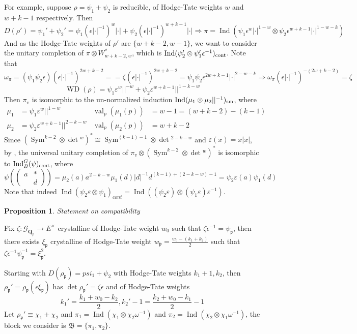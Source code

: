 \documentclass[leqno]{amsart}
\newcommand{\smat}[1]{\left( \begin{smallmatrix} #1 \end{smallmatrix} \right)}
\newcommand{\B}{\mathfrak B}
\newcommand{\Gp}{\mathcal{G}_{\Qp}} %
\DeclareMathOperator{\WD}{WD}
\newcommand{\cont}{\textnormal{cont}}
\newcommand{\sm}{\textnormal{sm}}
\DeclareMathOperator{\Sym}{Sym}
\newcommand{\Qp}{\mathbf{Q}_p}
\DeclareMathOperator{\val}{val}
\newcommand{\fp}{\mathfrak{p}}
\DeclareMathOperator{\Ind}{Ind}
\newtheorem{prop}[thm]{Proposition}
\theoremstyle{definition}
\theoremstyle{remark}
\begin{document}
For example, suppose 
$\rho=\psi_1+\psi_2$ is reducible,
of Hodge-Tate weights 
$w$ and  $w+k-1$ respectively. Then
\[
	D(\rho')=\psi_1'+\psi_2'=
	\psi_1(\epsilon|\cdot|^{-1})^w|\cdot|+
	\psi_2(\epsilon|\cdot|^{-1})^{w+k-1}|\cdot|
	\Longrightarrow
	\pi=\Ind
	( \psi_1\epsilon^w|\cdot|^{1-w}\otimes
	\psi_2\epsilon^{w+k-1}|\cdot|^{1-w-k})
\]
And as the Hodge-Tate weights of $\rho'$
are  $\{w+k-2,w-1\}$,
we want to consider the unitary completion 
of  $\pi\otimes W_{w+k-2,w}^*$,
which is $\Ind(\psi_2'\otimes\psi_1'\epsilon^{-1})_{\cont}$.
Note that
\[
	\omega_\pi
	=(\psi_1\psi_2\epsilon)
	(\epsilon|\cdot|^{-1})^{2w+k-2}=
	=\zeta (\epsilon|\cdot|^{-1})^{2w+k-2}=
	\psi_1\psi_2\epsilon^{2w+k-1}
	|\cdot|^{2-w-k}
	\Longrightarrow
	\omega_\pi
	(\epsilon|\cdot|^{-1})^{-(2w+k-2)}=\zeta
\]
\[
	\WD(\rho)=\psi_1\varepsilon^w||^{-w}+
	\psi_2\varepsilon^{w+k-1}||^{1-k-w}
\]
Then $\pi_v$ is isomorphic to the un-normalized induction
$\Ind(\mu_1\otimes\mu_2||^{-1})_{\sm}$, where
\begin{align*}
	\mu_1&=\psi_1\varepsilon^{w}||^{1-w} &
	\val_p(\mu_1(p))&=w-1=(w+k-2)-(k-1)\\
	\mu_2&=\psi_2\varepsilon^{w+k-1}||^{2-k-w} &
	\val_p(\mu_2(p))&=w+k-2
\end{align*}
Since $(\Sym^{k-2}\otimes\det{}^w)^*\cong \Sym^{(k-1)-1}\otimes\det{}^{2-k-w}$
and $\varepsilon(x)=x|x|$,
by \cite[Thm 12.3]{pask}, 
the universal unitary completion
of $\pi_v\otimes(\Sym^{k-2}\otimes\det{}^w)^*$
is isomorphic to $\Ind_B^G(\psi)_{\cont}$, where
\[
	\psi(\smat{a&*\\&d})=\mu_2(a)a^{2-k-w}\mu_1(d)|d|^{-1}d^{(k-1)+(2-k-w)-1}
	=\psi_2\varepsilon(a)\psi_1(d)
\]
Note that indeed 
$\Ind(\psi_2\varepsilon\otimes\psi_1)_{cont}=
\Ind((\psi_2\varepsilon)\otimes(\psi_1\varepsilon)\varepsilon^{-1})$.


\begin{prop}
	Statement on compatibility
\end{prop}

Fix $\zeta\colon \Gp\to E^\times$
crystalline of Hodge-Tate weight  $w_0$
such that  $\zeta\epsilon^{-1}=\psi_\fp$,
then there exists $\xi_\fp$
crystalline of Hodge-Tate weight  
$w_\fp=\frac{w_0-(k_1+k_2)}{2}$
such that $\zeta\epsilon^{-1}\psi_\fp^{-1}=\xi_\fp^{2}$.

Starting with $D(\rho_\fp)=psi_1+\psi_2$
with Hodge-Tate weights  $k_1+1,k_2$, 
then  $\rho_\fp'=\rho_\fp(\epsilon\xi_\fp)$
has  $\det\rho_\fp'=\zeta\epsilon$
and of Hodge-Tate weights
 \[
	k_1'=\frac{k_1+w_0-k_2}{2},
	k_2'-1=\frac{k_2+w_0-k_1}{2}-1
\]
Let $\rho_\fp'\equiv \chi_1+\chi_2$
and  $\pi_1=\Ind(\chi_1\otimes\chi_2\omega^{-1})$
and $\pi_2=\Ind(\chi_2\otimes\chi_1\omega^{-1})$,
the block we consider is  $\B=\{\pi_1,\pi_2\}$.
\end{document}
